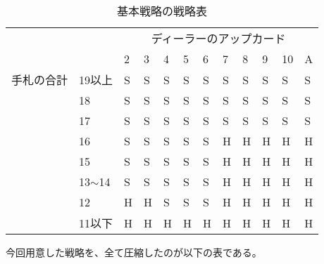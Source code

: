 \begin{table}[H]
\caption{基本戦略の戦略表}
\label{table:data_type}
\begin{center}
\begin{tabular}{llllllllllll}
\hline
			     &              & \multicolumn{10}{c}{ディーラーのアップカード}      \\ \cline{3-12} 
                        &              & 2 & 3 & 4 & 5 & 6 & 7 & 8 & 9 & 10 & A \\ \hline
{手札の合計}  & 19以上        & S & S & S & S & S & S & S & S & S  & S \\
                        & 18          & S & S & S & S & S & S & S & S & S  & S \\
                        & 17          & S & S & S & S & S & S & S & S & S  & S \\
                        & 16          & S & S & S & S & S & H & H & H & H  & H \\
                        & 15          & S & S & S & S & S & H & H & H & H  & H \\
                        & 13$\sim$14  & S & S & S & S & S & H & H & H & H  & H \\
                        & 12          & H & H & S & S & S & H & H & H & H  & H \\
                        & 11以下        & H & H & H & H & H & H & H & H & H  & H
\end{tabular}
\end{center}
\end{table}

今回用意した戦略を、全て圧縮したのが以下の表である。



